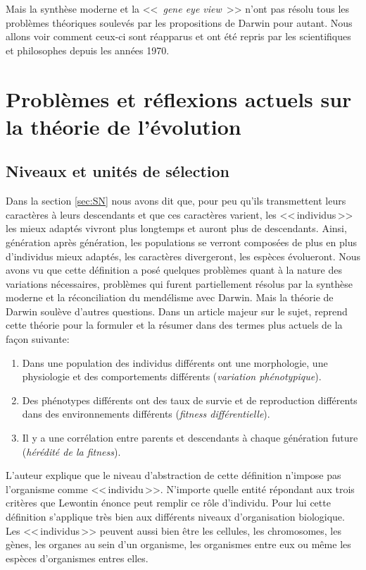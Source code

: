 Mais la synthèse moderne et la <<~\emph{gene eye view}~>> n'ont pas résolu tous les problèmes théoriques soulevés par les propositions de Darwin pour autant. Nous allons voir comment ceux-ci sont réapparus et ont été repris par les scientifiques et philosophes depuis les années 1970.


\section{Problèmes et réflexions actuels sur la théorie de l'évolution}\label{sec:pbm}
\subsection{Niveaux et unités de sélection}\label{sec:lvl}
Dans la section \ref{sec:SN} nous avons dit que, pour peu qu'ils transmettent leurs caractères à leurs descendants et que ces caractères varient, les <<\,individus\,>> les mieux adaptés vivront plus longtemps et auront plus de descendants. Ainsi, génération après génération, les populations se verront composées de plus en plus d'individus mieux adaptés, les caractères divergeront, les espèces évolueront. Nous avons vu que cette définition a posé quelques problèmes quant à la nature des variations nécessaires, problèmes qui furent partiellement résolus par la synthèse moderne et la réconciliation du mendélisme avec Darwin. Mais la théorie de Darwin soulève d'autres questions. Dans un article majeur sur le sujet, \cite{lewontin70unitsselection} reprend cette théorie pour la formuler et la résumer dans des termes plus actuels de la façon suivante:
\begin{enumerate}
	\item Dans une population des individus différents ont une morphologie, une physiologie et des comportements différents (\emph{variation phénotypique}).
\item Des phénotypes différents ont des taux de survie et de reproduction différents dans des environnements différents (\emph{fitness différentielle}).
	\item Il y a une corrélation entre parents et descendants à chaque génération future (\emph{hérédité de la fitness}).
\end{enumerate}

L'auteur explique que le niveau d'abstraction de cette définition n'impose pas l'organisme comme <<\,individu\,>>. N'importe quelle entité répondant aux trois critères que Lewontin énonce peut remplir ce rôle d'individu. Pour lui cette définition s'applique très bien aux différents niveaux d'organisation biologique. Les <<\,individus\,>> peuvent aussi bien être les cellules, les chromosomes, les gènes, les organes au sein d'un organisme, les organismes entre eux ou même les espèces d'organismes entres elles. 

